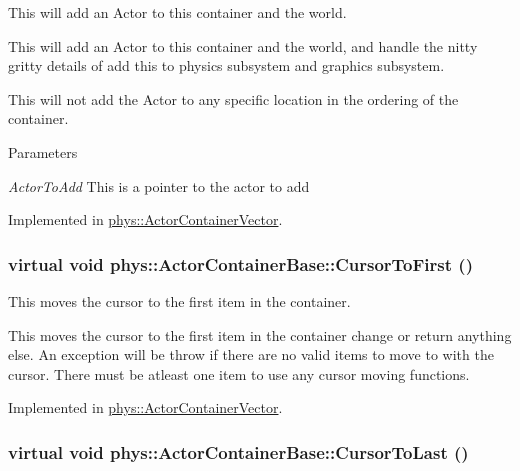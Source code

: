 This will add an Actor to this container and the world. 

This will add an Actor to this container and the world, and handle the nitty gritty details of add this to physics subsystem and graphics subsystem. \par
\par
 This will not add the Actor to any specific location in the ordering of the container. 
\begin{DoxyParams}{Parameters}
\item[{\em ActorToAdd}]This is a pointer to the actor to add \end{DoxyParams}


Implemented in \hyperlink{classphys_1_1ActorContainerVector_a4bc3e38f16caddee021a97739bebaf6e}{phys::ActorContainerVector}.

\hypertarget{classphys_1_1ActorContainerBase_ab1a44758d7c17e70ff2e0f8de47424c3}{
\subsubsection[{CursorToFirst}]{\setlength{\rightskip}{0pt plus 5cm}virtual void phys::ActorContainerBase::CursorToFirst ()}}
\label{d1/d00/classphys_1_1ActorContainerBase_ab1a44758d7c17e70ff2e0f8de47424c3}


This moves the cursor to the first item in the container. 

This moves the cursor to the first item in the container change or return anything else. An exception will be throw if there are no valid items to move to with the cursor. There must be atleast one item to use any cursor moving functions. 

Implemented in \hyperlink{classphys_1_1ActorContainerVector_ad9c2eb2a9405dcf687c86745afc9c031}{phys::ActorContainerVector}.

\hypertarget{classphys_1_1ActorContainerBase_afad072e018a04c190e5e5fb93b82b354}{
\subsubsection[{CursorToLast}]{\setlength{\rightskip}{0pt plus 5cm}virtual void phys::ActorContainerBase::CursorToLast ()}}
\label{d1/d00/classphys_1_1ActorContainerBase_afad072e018a04c190e5e5fb93b82b354}


